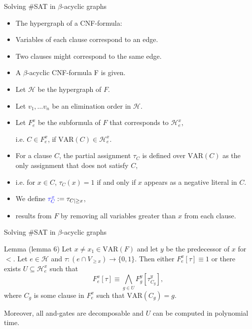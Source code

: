 \begin{frame}[t]{Solving \#SAT in $\beta$-acyclic graphs}
	\begin{itemize}[<+->]
	\item The hypergraph of a CNF-formula:
	\item[]\hspace{1cm}Variables of each clause correspond to an edge.
	\item[]\hspace{1cm}Two clauses might correspond to the same edge.
	\item A $\beta$-acyclic CNF-formula F is given.
	\item Let $\mathcal{H}$ be the hypergraph of $F$.
	\item Let $v_1, \dots v_n$ be an elimination order in $\mathcal{H}$.
	\item Let {\color{blue}$F^x_e$} be the subformula of $F$ that corresponds to $\mathcal{H}^x_e$,

	\hspace{1cm}i.e. $C \in F^x_e$, if $\mathrm{VAR}(C) \in \mathcal{H}^x_e$.
	\item For a clause $C$, the partial assignment {\color{blue}$\tau_C$} is defined over $\mathrm{VAR}(C)$ as the only assignment that does not satisfy $C$,
	\item[]\hspace{1cm}i.e. for $x \in C$, $\tau_C(x) = 1$ if and only if $x$ appears as a negative literal in $C$.
	\item We define ${\color{blue}\tau^x_C} := \tau_{C|\geq x}$,
	\item[] results from $F$ by removing all variables greater than $x$ from each clause.
	\end{itemize}
\end{frame}
\begin{frame}[t]{Solving \#SAT in $\beta$-acyclic graphs}
	\begin{block}{Lemma (lemma 6)}
		Let $x \neq x_1 \in \mathrm{VAR}(F)$ and let $y$ be the predecessor of $x$ for $<$. Let $e \in \mathcal{H}$ and $\tau : (e \cap V_{\geq x}) \rightarrow \{0, 1\}$. Then either $F^x_e[\tau] \equiv 1$ or there exists $U \subseteq \mathcal{H}^x_e$ such that 
		$$ F^x_e[\tau] \equiv \bigwedge\limits_{g \in U} F^y_g[\tau^y_{C_g}],$$
		where $C_g$ is some clause in $F^x_e$ such that $\mathrm{VAR}(C_g) = g$.
		
		Moreover, all and-gates are decomposable and $U$ can be computed in polynomial time.
	\end{block}
\end{frame}
